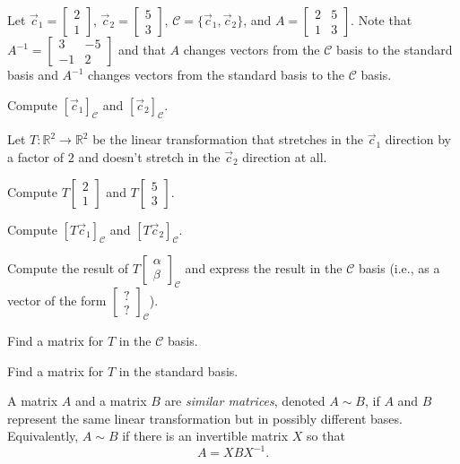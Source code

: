 \documentclass{problemset}
\newcommand{\R}{\mathbb{R}}
\newcommand{\mat}[1]{\begin{bmatrix}#1\end{bmatrix}}
\begin{document}
	\question
	Let $\vec c_1=\mat{2\\1}$, $\vec c_2=\mat{5\\3}$, $\mathcal C=\{\vec c_1,\vec c_2\}$, and $A=\mat{2&5\\1&3}$.
	Note that $A^{-1}=\mat{3&-5\\-1&2}$ and that $A$ changes vectors from the $\mathcal C$ basis to the standard
	basis and $A^{-1}$ changes vectors from the standard basis to the $\mathcal C$ basis.
	\begin{parts}
		\item Compute $[\vec c_1]_{\mathcal C}$ and $[\vec c_2]_{\mathcal C}$.
	\end{parts}
	Let $T:\R^2\to\R^2$ be the linear transformation that stretches in the $\vec c_1$ direction by a factor of $2$
	and doesn't stretch in the $\vec c_2$ direction at all.
	\begin{parts}[resume]
		\item Compute $T\mat{2\\1}$ and $T\mat{5\\3}$.
		\item Compute $[T\vec c_1]_{\mathcal C}$ and $[T\vec c_2]_{\mathcal C}$.
		\item Compute the result of $T\mat{\alpha\\\beta}_{\mathcal C}$ and express the result in the
			$\mathcal C$ basis (i.e., as a vector of the form $\mat{?\\?}_{\mathcal C}$).
		\item Find a matrix for $T$ in the $\mathcal C$ basis.
		\item Find a matrix for $T$ in the standard basis.
	\end{parts}
	\begin{definition}
		A matrix $A$ and a matrix $B$ are \emph{similar matrices}, denoted $A\sim B$, if
		$A$ and $B$ represent the same linear transformation but in possibly different bases.
		Equivalently, $A\sim B$ if there is an invertible matrix $X$ so that
		\[
			A=XBX^{-1}.
		\]
	\end{definition}
\end{document}
